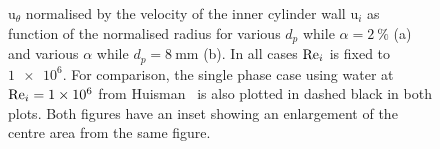 \begin{figure}
\centering%
%
%
\caption{%
$\text{u}_\theta$ normalised by the velocity of the inner cylinder wall
$\text{u}_i$ as function of the normalised radius for various $d_p$ while
$\alpha=\SI{2}{\percent}$ (a) and various $\alpha$ while
$d_p=\SI{8}{\milli\metre}$ (b). In all cases $\text{Re}_i$ is fixed to $\num{1e6}$.
For comparison, the single phase case using water at $\text{Re}_i=\num{1e6}$ from
Huisman~\citep{Huisman2013} is also plotted in dashed black in both plots. Both figures
have an inset showing an enlargement of the centre area from the same
figure.} \label{fig:ldaradial}
\end{figure}

